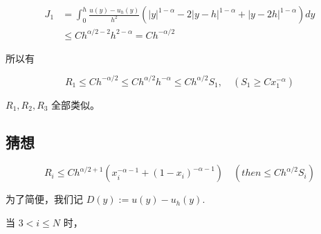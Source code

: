 \documentclass{ctexart}
\begin{document}
\begin{equation}
    \begin{aligned}
        J_1 & = \int_0^h \frac{ u(y) - u_h(y) }{h^2} (|y|^{1-\alpha} - 2|y-h|^{1-\alpha} + |y-2h|^{1-\alpha}) dy \\
        &\le C h^{\alpha/2-2} h^{2-\alpha} = C h^{-\alpha/2}
    \end{aligned}
\end{equation}

所以有

\begin{equation}
    R_1 \le C h^{-\alpha/2} \le C h^{\alpha/2} h^{-\alpha} \le C h^{\alpha/2} S_1, \quad (S_1\ge C x_1^{-\alpha})
\end{equation}


\(R_1, R_2, R_3\) 全部类似。

\subsection{猜想}

\begin{equation}
    R_i \le C h^{\alpha/2+1} (x_i^{-\alpha-1} + (1-x_i)^{-\alpha-1}) \quad (then \le C h^{\alpha/2} S_i)
\end{equation}

为了简便，我们记 \(D(y) := u(y) - u_h(y)\).

当 \(3<i\le N\) 时，
\end{document}
